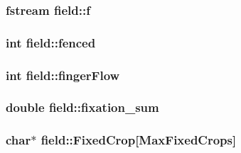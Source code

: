 \label{classfield_ab34c30afdf90e35b899c7a4120db6566}
\hypertarget{classfield_a2d250d63f6438e6ebdfd1e4c4bf1292e}{
\subsubsection[{f}]{\setlength{\rightskip}{0pt plus 5cm}fstream {\bf field::f}}}
\label{classfield_a2d250d63f6438e6ebdfd1e4c4bf1292e}
\hypertarget{classfield_af2d4002c30bf188d089dbe1d33a0b784}{
\subsubsection[{fenced}]{\setlength{\rightskip}{0pt plus 5cm}int {\bf field::fenced}}}
\label{classfield_af2d4002c30bf188d089dbe1d33a0b784}
\hypertarget{classfield_a5a67b4783694d4ba4cf87270306b910b}{
\subsubsection[{fingerFlow}]{\setlength{\rightskip}{0pt plus 5cm}int {\bf field::fingerFlow}}}
\label{classfield_a5a67b4783694d4ba4cf87270306b910b}
\hypertarget{classfield_a5b73ff6306457cefd90df1f718595008}{
\subsubsection[{fixation\_\-sum}]{\setlength{\rightskip}{0pt plus 5cm}double {\bf field::fixation\_\-sum}}}
\label{classfield_a5b73ff6306457cefd90df1f718595008}
\hypertarget{classfield_aad91c5b34d09b1eceee5fd72cfce99bb}{
\subsubsection[{FixedCrop}]{\setlength{\rightskip}{0pt plus 5cm}char$\ast$ {\bf field::FixedCrop}\mbox{[}MaxFixedCrops\mbox{]}}}
